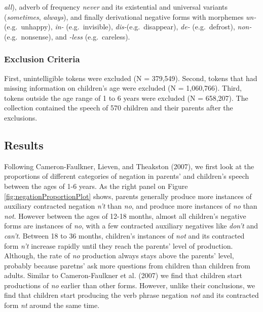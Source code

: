 \documentclass[man,floatsintext,draftall]{apa6}
\begin{document}
\emph{all}), adverb of frequency \emph{never} and its existential and universal variants (\emph{sometimes}, \emph{always}), and finally derivational negative forms with morphemes \emph{un-} (e.g.~unhappy), \emph{in-} (e.g.~invisible), \emph{dis-}(e.g.~disappear), \emph{de-} (e.g.~defrost), \emph{non-} (e.g.~nonsense), and \emph{-less} (e.g.~careless).

\hypertarget{exclusion-criteria}{%
\subsubsection{Exclusion Criteria}\label{exclusion-criteria}}

First, unintelligible tokens were excluded (N = 379,549). Second, tokens that had missing information on children's age were excluded (N = 1,060,766). Third, tokens outside the age range of 1 to 6 years were excluded (N = 658,207). The collection contained the speech of 570 children and their parents after the exclusions.

\hypertarget{results}{%
\subsection{Results}\label{results}}

Following Cameron-Faulkner, Lieven, and Theakston (2007), we first look at the proportions of different categories of negation in parents' and children's speech between the ages of 1-6 years. As the right panel on Figure \ref{fig:negationProportionPlot} shows, parents generally produce more instances of auxiliary contracted negation \emph{n't} than \emph{no}, and produce more instances of \emph{no} than \emph{not}. However between the ages of 12-18 months, almost all children's negative forms are instances of \emph{no}, with a few contracted auxiliary negatives like \emph{don't} and \emph{can't}. Between 18 to 36 months, children's instances of \emph{not} and its contracted form \emph{n't} increase rapidly until they reach the parents' level of production. Although, the rate of \emph{no} production always stays above the parents' level, probably because paretns' ask more questions from children than children from adults. Similar to Cameron-Faulkner et al. (2007) we find that children start productions of \emph{no} earlier than other forms. However, unlike their conclusions, we find that children start producing the verb phrase negation \emph{not} and its contracted form \emph{nt} around the same time.
\end{document}
